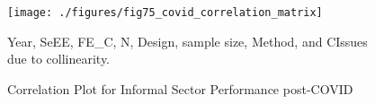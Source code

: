 \documentclass[12pt, english]{article}
\begin{document}
    \begin{figure}[p]
        \centering
        \texttt{[image: ./figures/fig75\_covid\_correlation\_matrix]}
        \caption{Correlation Plot for Informal Sector Performance post-COVID}
        \label{fig23:corrplot-inform-sector-postcovid}
        \begin{minipage}{10cm}
            \vspace{.1cm}
            \small Year, SeEE, FE\_C, N, Design, sample size, Method, and CIssues due to collinearity.
        \end{minipage}
    \end{figure}
\end{document}
